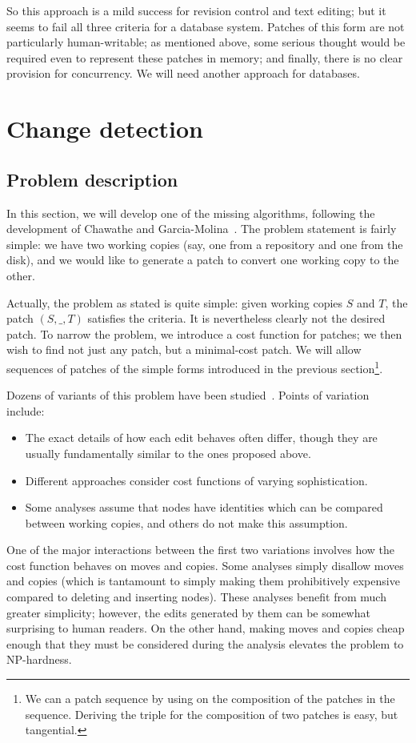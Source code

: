 \documentclass{article}
\newif\ifhighlightnew\highlightnewfalse
\newenvironment{newcontent}{\ifhighlightnew\color{green!55!black}[new]\fi}{\ifhighlightnew\color{black}\fi}
\begin{document}
\begin{newcontent}
So this approach is a mild success for revision control and text
editing; but it seems to fail all three criteria for a database system.
Patches of this form are not particularly human-writable; as mentioned
above, some serious thought would be required even to represent these
patches in memory; and finally, there is no clear provision for concurrency.
We will need another approach for databases.
\end{newcontent}

\section{Change detection}
\label{sec:detection}
\subsection{Problem description}
In this section, we will develop one of the missing algorithms, following
the development of Chawathe and Garcia-Molina~\cite{chawathe1997meaningful}.
The problem statement is fairly simple: we have two working copies (say, one
from a repository and one from the disk), and we would like to generate a
patch to convert one working copy to the other.

Actually, the problem as stated is quite simple: given working copies $S$
and $T$, the patch $(S,\_,T)$ satisfies the criteria. It is nevertheless
clearly not the desired patch. To narrow the problem, we introduce a cost
function for patches; we then wish to find not just any patch, but a
minimal-cost patch. We will allow sequences of patches of the simple forms
introduced in the previous section\footnote{We can \apply a patch sequence
by using \apply on the composition of the patches in the sequence. Deriving
the triple for the composition of two patches is easy, but tangential.}.

Dozens of variants of this problem have been
studied~\cite{chawathe1997expressive,chawathe1996change,cobena2002detecting,wang2004x}.
Points of variation include:
\begin{itemize}
    \item The exact details of how each edit behaves often differ, though
        they are usually fundamentally similar to the ones proposed above.
    \item Different approaches consider cost functions of varying
        sophistication.
    \item Some analyses assume that nodes have identities which can be
        compared between working copies, and others do not make this
        assumption.
\end{itemize}
One of the major interactions between the first two variations involves how
the cost function behaves on moves and copies. Some analyses simply disallow
moves and copies (which is tantamount to simply making them prohibitively
expensive compared to deleting and inserting nodes). These analyses benefit
from much greater simplicity; however, the edits generated by them can be
somewhat surprising to human readers. On the other hand, making moves and
copies cheap enough that they must be considered during the analysis
elevates the problem to NP-hardness.
\end{document}
